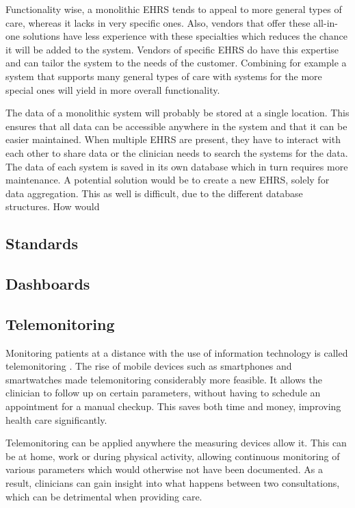         Functionality wise, a monolithic EHRS tends to appeal to more general types of care, whereas it lacks in very specific ones. Also, vendors that offer these all-in-one solutions have less experience with these specialties which reduces the chance it will be added to the system. Vendors of specific EHRS do have this expertise and can tailor the system to the needs of the customer. Combining for example a system that supports many general types of care with systems for the more special ones will yield in more overall functionality.

        The data of a monolithic system will probably be stored at a single location. This ensures that all data can be accessible anywhere in the system and that it can be easier maintained. When multiple EHRS are present, they have to interact with each other to share data or the clinician needs to search the systems for the data. The data of each system is saved in its own database which in turn requires more maintenance. A potential solution would be to create a new EHRS, solely for data aggregation. This as well is difficult, due to the different database structures. How would 



    \subsection{Standards} \label{2_standards}

    \subsection{Dashboards}


    \subsection{Telemonitoring} \label{2_telemonitoring}
    Monitoring patients at a distance with the use of information technology is called telemonitoring \cite{telemonitoring_definition}. The rise of mobile devices such as smartphones and smartwatches made telemonitoring considerably more feasible. It allows the clinician to follow up on certain parameters, without having to schedule an appointment for a manual checkup. This saves both time and money, improving health care significantly.
    
    Telemonitoring can be applied anywhere the measuring devices allow it. This can be at home, work or during physical activity, allowing continuous monitoring of various parameters which would otherwise not have been documented. As a result, clinicians can gain insight into what happens between two consultations, which can be detrimental when providing care.
    
